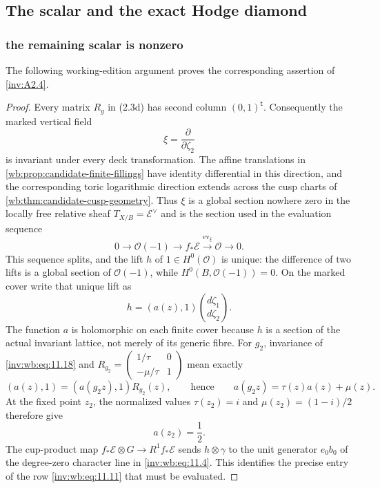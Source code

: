 \subsection{The scalar and the exact Hodge diamond}

\subsubsection{the remaining scalar is nonzero}\label{inv:wbproof:thm:h12-scalar}
The following working-edition argument proves the corresponding assertion of \cref{inv:A2.4}.


\begin{proof}
Every matrix $R_g$ in (2.3d) has second column $(0,1)^{\mathsf t}$.
Consequently the marked vertical field
\[
 \xi=\frac{\partial}{\partial\zeta_2}
\]
is invariant under every deck transformation.  The affine translations in
\cref{wb:prop:candidate-finite-fillings} have identity differential in this
direction, and the corresponding toric logarithmic direction extends across
the cusp charts of \cref{wb:thm:candidate-cusp-geometry}.  Thus $\xi$ is a
global section nowhere zero in the locally free relative sheaf
$T_{X/B}=\mathcal E^\vee$ and is the section used in the evaluation sequence
\[
 0\longrightarrow\mathcal O(-1)\longrightarrow f_*\mathcal E
 \xrightarrow{\operatorname{ev}_\xi}\mathcal O\longrightarrow0.
\]
This sequence splits, and the lift $h$ of $1\in H^0(\mathcal O)$ is unique:
the difference of two lifts is a global section of $\mathcal O(-1)$, while
$H^0(B,\mathcal O(-1))=0$.  On the marked cover write that unique lift as
\[
 h=(a(z),1)\binom{d\zeta_1}{d\zeta_2}.
\tag{WBH.11.18}\label{inv:wb:eq:11.18}
\]
The function $a$ is holomorphic on each finite cover because $h$ is a
section of the actual invariant lattice, not merely of its generic fibre.
For $g_2$, invariance of \eqref{inv:wb:eq:11.18} and
$R_{g_2}=\left(\begin{smallmatrix}1/\tau&0\\-\mu/\tau&1\end{smallmatrix}\right)$
mean exactly
\[
 (a(z),1)=(a(g_2z),1)R_{g_2}(z),
 \qquad\text{hence}\qquad
 a(g_2z)=\tau(z)a(z)+\mu(z).
\tag{WBH.11.18a}\label{inv:wb:eq:11.18a}
\]
At the fixed point $z_2$, the normalized values
$\tau(z_2)=i$ and $\mu(z_2)=(1-i)/2$ therefore give
\[
 a(z_2)=\frac12.
\tag{WBH.11.18b}\label{inv:wb:eq:11.18b}
\]
The cup-product map
$f_*\mathcal E\otimes G\to R^1f_*\mathcal E$ sends
$h\otimes\gamma$ to the unit generator $e_0b_0$ of the degree-zero
character line in \eqref{inv:wb:eq:11.4}.  This identifies the precise entry of the row
\eqref{inv:wb:eq:11.11} that must be evaluated.


\end{proof}

